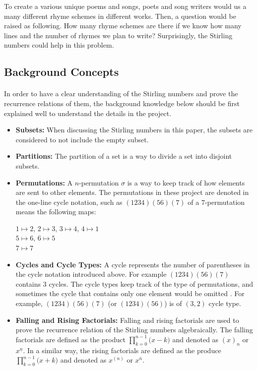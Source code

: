 \documentclass{article}
\theoremstyle{definition}
\theoremstyle{remark}
\theoremstyle{example}
\begin{document}
To create a various unique poems and songs, poets and song writers would us a many different rhyme schemes in different works. Then, a question would be raised as following. How many rhyme schemes are there if we know how many lines and the number of rhymes we plan to write? Surprisingly, the Stirling numbers could help in this problem.

\subsection{Background Concepts}
\paragraph{   }

In order to have a clear understanding of the Stirling numbers and prove the recurrence relations of them, the background knowledge below should be first explained well to understand the details in the project.
\begin{itemize}
\item \textbf{Subsets:} When discussing the Stirling numbers in this paper, the subsets are considered to not include the empty subset.
\item \textbf{Partitions:} The partition of a set is a way to divide a set into disjoint subsets.
\item \textbf{Permutations:} A $n$-permutation $\sigma$ is a way to keep track of how elements are sent to other elements. The permutations in these project are denoted in the one-line cycle notation, such as $(1234)(56)(7)$ of a $7$-permutation means the following maps\cite{guichard_combinatorics_nodate}:

\begin{center}
$1 \mapsto 2$, $2 \mapsto 3 $, $3\mapsto 4$, $4\mapsto 1$\\
$5\mapsto 6$, $6\mapsto 5$\\
$7 \mapsto 7$
\end{center}

\item \textbf{Cycles and Cycle Types:} A cycle represents the number of parentheses in the cycle notation introduced above. For example $(1234)(56)(7)$ contains $3$ cycles. The cycle types keep track of the type of permutations, and sometimes the cycle that contains only one element would be omitted \cite{guichard_combinatorics_nodate}. For example, $(1234)(56)(7)$ (or $(1234)(56)$) is of $(3,2)$ cycle type.
\item \textbf{Falling and Rising Factorials:} Falling and rising factorials are used to prove the recurrence relation of the Stirling numbers algebraically. The falling factorials are defined as the product ${\displaystyle \prod_{k = 0}^{n - 1}{(x-k})}$ and denoted as $(x)_n$ or $x^{\underline{n}}$. In a similar way, the rising factorials are defined as the produce  ${\displaystyle \prod_{k = 0}^{n - 1}{(x+k})}$ and denoted as $x^{(n)}$ or $x^{\overline{n}}$\cite{bona_combinatorics_2012}.
\end{itemize}
\end{document}
